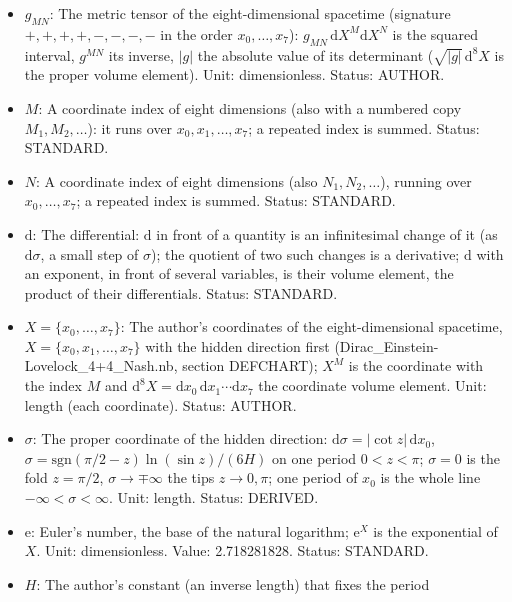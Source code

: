 \documentclass[
  10pt,
]{article}
\providecommand{\tightlist}{%
  \setlength{\itemsep}{0pt}\setlength{\parskip}{0pt}}
\begin{document}
\begin{itemize}
\tightlist
\item
  \(g_{MN}\): The metric tensor of the eight-dimensional spacetime
  (signature \(+,+,+,+,-,-,-,-\) in the order \(x_0, \dots, x_7\)):
  \(g_{MN}\,\mathrm{d}X^M\mathrm{d}X^N\) is the squared interval,
  \(g^{MN}\) its inverse, \(\lvert g\rvert\) the absolute value of its
  determinant (\(\sqrt{\lvert g\rvert}\,\mathrm{d}^8X\) is the proper
  volume element). Unit: dimensionless. Status: AUTHOR.
\item
  \(M\): A coordinate index of eight dimensions (also with a numbered
  copy \(M_1, M_2, \dots\)): it runs over \(x_0, x_1, \dots, x_7\); a
  repeated index is summed. Status: STANDARD.
\item
  \(N\): A coordinate index of eight dimensions (also
  \(N_1, N_2, \dots\)), running over \(x_0, \dots, x_7\); a repeated
  index is summed. Status: STANDARD.
\item
  \(\mathrm{d}\): The differential: \(\mathrm{d}\) in front of a
  quantity is an infinitesimal change of it (as \(\mathrm{d}\sigma\), a
  small step of \(\sigma\)); the quotient of two such changes is a
  derivative; \(\mathrm{d}\) with an exponent, in front of several
  variables, is their volume element, the product of their
  differentials. Status: STANDARD.
\item
  \(X = \{x_0, \dots, x_7\}\): The author's coordinates of the
  eight-dimensional spacetime, \(X = \{x_0, x_1, \dots, x_7\}\) with the
  hidden direction first (Dirac\_Einstein-Lovelock\_4+4\_Nash.nb,
  section DEFCHART); \(X^M\) is the coordinate with the index \(M\) and
  \(\mathrm{d}^8X = \mathrm{d}x_0\,\mathrm{d}x_1\cdots\mathrm{d}x_7\)
  the coordinate volume element. Unit: length (each coordinate). Status:
  AUTHOR.
\item
  \(\sigma\): The proper coordinate of the hidden direction:
  \(\mathrm{d}\sigma = \lvert\cot z\rvert\,\mathrm{d}x_0\),
  \(\sigma = \mathrm{sgn}(\pi/2 - z)\ln(\sin z)/(6H)\) on one period
  \(0 < z < \pi\); \(\sigma = 0\) is the fold \(z = \pi/2\),
  \(\sigma \to \mp\infty\) the tips \(z \to 0, \pi\); one period of
  \(x_0\) is the whole line \(-\infty < \sigma < \infty\). Unit: length.
  Status: DERIVED.
\item
  \(\mathrm{e}\): Euler's number, the base of the natural logarithm;
  \(\mathrm{e}^{X}\) is the exponential of \(X\). Unit: dimensionless.
  Value: 2.718281828. Status: STANDARD.
\item
  \(H\): The author's constant (an inverse length) that fixes the period

\end{itemize}
\end{document}
